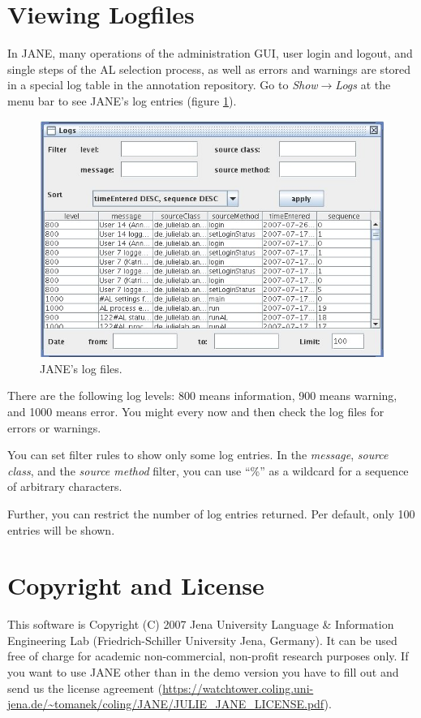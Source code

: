\documentclass[DIV12,english,11pt,halfparskip]{scrartcl}
\begin{document}
\section{Viewing Logfiles}

In JANE, many operations of the administration GUI, user login and
logout, and single steps of the AL selection process, as well as
errors and warnings are stored in a special log table in the
annotation repository. Go to \emph{Show$\rightarrow$Logs} at the menu
bar to see JANE's log entries (figure \ref{fig:showlogs}).


\begin{figure}[h]
  \centering
  \includegraphics[scale=0.5]{figs/ShowLogs.jpg}
  \caption{JANE's log files.}
  \label{fig:showlogs}
\end{figure}

There are the following log levels: 800 means information, 900 means
warning, and 1000 means error. You might every now and then check the
log files for errors or warnings.

You can set filter rules to show only some log entries. In the
\emph{message}, \emph{source class}, and the \emph{source method}
filter, you can use ``\%'' as a wildcard for a sequence of arbitrary
characters.

Further, you can restrict the number of log entries returned. Per
default, only 100 entries will be shown.

\section{Copyright and License}

This software is Copyright (C) 2007 Jena University Language \&
Information Engineering Lab (Friedrich-Schiller University Jena,
Germany). It can be used free of charge for academic non-commercial,
non-profit research purposes only. If you want to use JANE other than
in the demo version you have to fill out and send us the license
agreement
(\url{https://watchtower.coling.uni-jena.de/~tomanek/coling/JANE/JULIE_JANE_LICENSE.pdf}).
\end{document}
